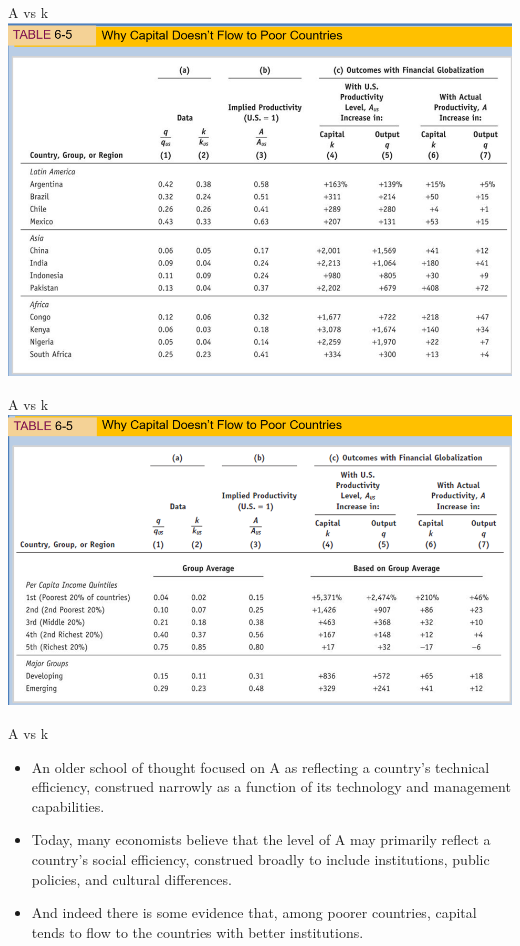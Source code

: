 \documentclass[
  ignorenonframetext,
]{beamer}
\providecommand{\tightlist}{%
  \setlength{\itemsep}{0pt}\setlength{\parskip}{0pt}}\usepackage{longtable,booktabs,array}
\begin{document}
\begin{frame}{A vs k}
\label{a-vs-k-1}
\includegraphics{pic3.png}
\end{frame}

\begin{frame}{A vs k}
\label{a-vs-k-2}
\includegraphics{pic4.png}
\end{frame}

\begin{frame}{A vs k}
\label{a-vs-k-3}
\begin{itemize}
\tightlist
\item
  An older school of thought focused on A as reflecting a country's
  technical efficiency, construed narrowly as a function of its
  technology and management capabilities.
\item
  Today, many economists believe that the level of A may primarily
  reflect a country's social efficiency, construed broadly to include
  institutions, public policies, and cultural differences.
\item
  And indeed there is some evidence that, among poorer countries,
  capital tends to flow to the countries with better institutions.
\end{itemize}
\end{frame}
\end{document}
